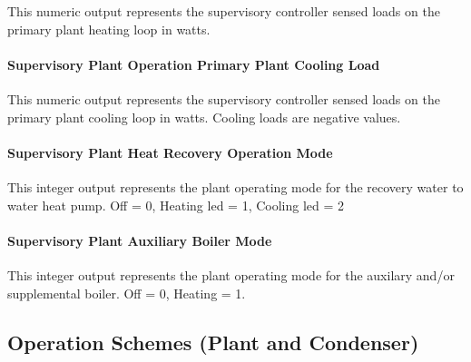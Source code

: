 This numeric output represents the supervisory controller sensed loads on the primary plant heating loop in watts.

\paragraph{Supervisory Plant Operation Primary Plant Cooling Load}\label{operation-scheme-outputs-supervisory-plant-cooling-loads}

This numeric output represents the supervisory controller sensed loads on the primary plant cooling loop in watts.  Cooling loads are negative values.

\paragraph{Supervisory Plant Heat Recovery Operation Mode}\label{operation-scheme-outputs-hr-operation-mode}

This integer output represents the plant operating mode for the recovery water to water heat pump.  Off = 0, Heating led = 1, Cooling led = 2

\paragraph{Supervisory Plant Auxiliary Boiler Mode}\label{operation-scheme-outputs-boiler-operation-mode}

This integer output represents the plant operating mode for the auxilary and/or supplemental boiler. Off = 0, Heating = 1.

\subsection{Operation Schemes (Plant and Condenser)}\label{operation-schemes-plant-and-condenser}

